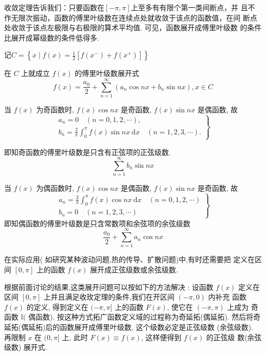 收敛定理告诉我们：只要函数在$[-\pi,\pi]$上至多有有限个第一类间断点，并
且不作无限次振动，函数的傅里叶级数在连续点处就收敛于该点的函数值，在间
断点处收敛于该点左极限与右极限的算术平均值. 可见，函数展开成傅里叶级数
的条件比展开成幂级数的条件低得多. 

\begin{corollary}
    记$
C=\left\{x \mid f(x)=\frac{1}{2}\left[f\left(x^{-}\right)+f\left(x^{+}\right)\right]\right\}
$

在 $ C $ 上就成立 $ f(x) $ 的傅里叶级数展开式
$$
f(x)=\frac{a_{0}}{2}+\sum_{n=1}^{\infty}\left(a_{n} \cos n x+b_{n} \sin n x\right), x \in C
$$
\end{corollary}

\begin{definition}[正弦级数]
    当 $ f(x) $ 为奇函数时, $ f(x) \cos n x $ 是奇函数, $ f(x) \sin n x $ 是偶函数, 故
$$
\left.\begin{array}{l}
a_{n}=0 \quad(n=0,1,2, \cdots), \\
b_{n}=\frac{2}{\pi} \int_{0}^{\pi} f(x) \sin n x \mathrm{~d} x \quad(n=1,2,3, \cdots) .
\end{array}\right\}
$$

即知奇函数的傅里叶级数是只含有正弦项的正弦级数.
$$ \sum_{n=1}^{\infty} b_{n} \sin n x $$
\end{definition}

\begin{definition}[余弦级数]
    当 $ f(x) $ 为偶函数时, $ f(x) \cos n x $ 是偶函数, $ f(x) \sin n x $ 是奇函数, 故
$$
\left.\begin{array}{l}
a_{n}=\frac{2}{\pi} \int_{0}^{\pi} f(x) \cos n x \mathrm{~d} x \quad(n=0,1,2, \cdots) \\
b_{n}=0 \quad(n=1,2,3, \cdots)
\end{array}\right\}
$$
即知偶函数的傅里叶级数是只含常数项和余弦项的余弦级数
$$
\frac{a_{0}}{2}+\sum_{n=1}^{\infty} a_{n} \cos n x
$$
\end{definition}

在实际应用( 如研究某种波动问题,热的传导、扩散问题)中,有时还需要把 定义在区间 $ [0, \pi] $ 上的函数 $ f(x) $ 展开成正弦级数或余弦级数.

根据前面讨论的结果,这类展开问题可以按如下的方法解决 : 设函数 $ f(x) $ 定义在区间 $ [0, \pi] $ 上并且满足收玫定理的条件,我们在开区间 $ (-\pi, 0) $ 内补充 函数 $ f(x) $ 的定义, 得到定义在 $ (-\pi, \pi] $ 上的函数 $ F(x) $, 使它在 $ (-\pi, \pi) $ 上成为 奇函数 $ \mathbb{I}( $ 偶函数). 按这种方式拓广函数定义域的过程称为奇延拓(偶延拓). 然后将奇延拓(偶延拓)后的函数展开成傅里叶级数, 这个级数必定是正弦级数 (余弦级数). 再限制 $ x $ 在 $ (0, \pi] $ 上, 此时 $ F(x) \equiv f(x) $, 这样便得到 $ f(x) $ 的正弦级 数(余弦级数) 展开式.


